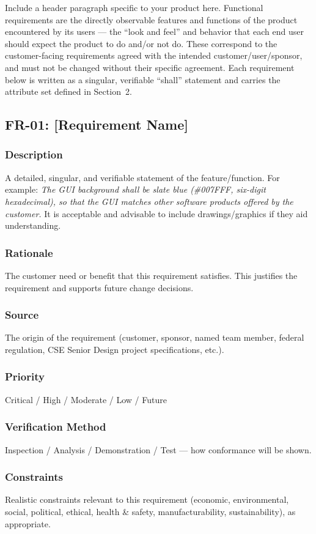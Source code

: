 Include a header paragraph specific to your product here. Functional requirements are the directly observable features and functions of the product encountered by its users --- the ``look and feel'' and behavior that each end user should expect the product to do and/or not do. These correspond to the customer-facing requirements agreed with the intended customer/user/sponsor, and must not be changed without their specific agreement. Each requirement below is written as a singular, verifiable ``shall'' statement and carries the attribute set defined in Section~2.

\subsection{FR-01: [Requirement Name]}
\subsubsection{Description}
A detailed, singular, and verifiable statement of the feature/function. For example: \textit{The GUI background shall be slate blue (\#007FFF, six-digit hexadecimal), so that the GUI matches other software products offered by the customer.} It is acceptable and advisable to include drawings/graphics if they aid understanding.
\subsubsection{Rationale}
The customer need or benefit that this requirement satisfies. This justifies the requirement and supports future change decisions.
\subsubsection{Source}
The origin of the requirement (customer, sponsor, named team member, federal regulation, CSE Senior Design project specifications, etc.).
\subsubsection{Priority}
Critical / High / Moderate / Low / Future
\subsubsection{Verification Method}
Inspection / Analysis / Demonstration / Test --- how conformance will be shown.
\subsubsection{Constraints}
Realistic constraints relevant to this requirement (economic, environmental, social, political, ethical, health \& safety, manufacturability, sustainability), as appropriate.
